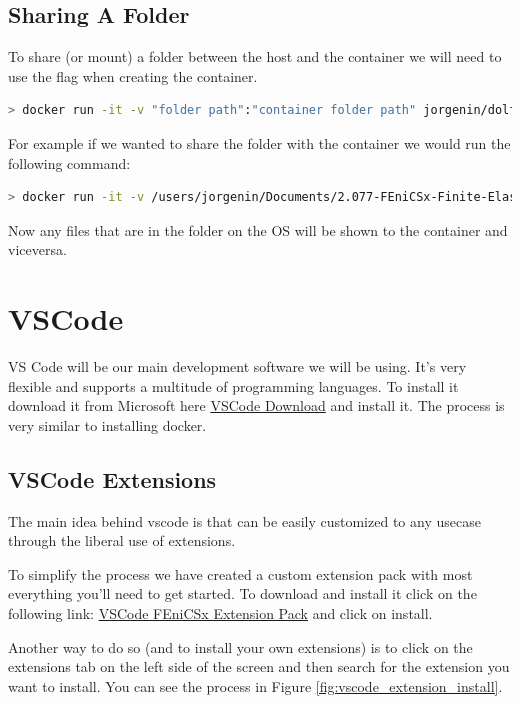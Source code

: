 \documentclass[final]{article}
\numberwithin{equation}{section}
\theoremstyle{remarkStyle}
\begin{document}
\subsection{Sharing A Folder}
To share (or mount) a folder between the host and the container we will need to use the  flag when creating the container.

\begin{lstlisting}[language=bash]
  > docker run -it -v "folder path":"container folder path" jorgenin/dolfinx-2.077:v0.8
\end{lstlisting}

For example if we wanted to share the folder  with the container we would run the following command:

\begin{lstlisting}[language=bash]
  > docker run -it -v /users/jorgenin/Documents/2.077-FEniCSx-Finite-Elasticity:/home/project jorgenin/dolfinx-2.077:v0.8
\end{lstlisting}

Now any files that are in the folder on the OS will be shown to the container and viceversa.

\section{VSCode}

VS Code will be our main development software we will be using. It's very flexible and supports a multitude of programming languages.
To install it download it from Microsoft here \href{https://code.visualstudio.com/download}{VSCode Download} and install it.
The process is very similar to installing docker.

\subsection{VSCode Extensions}

The main idea behind vscode is that can be easily customized to any usecase through the liberal use of extensions.

To simplify the process we have created a custom extension pack with most everything you'll need to get started.
To download and install it click on the following link: \href{https://marketplace.visualstudio.com/items?itemName=2077MIT.2-077-fenicsx-extension-pack}{VSCode FEniCSx Extension Pack} and click on install.

Another way to do so (and to install your own extensions) is to click on the extensions tab on the left side of the screen and then search for the extension you want to install.
You can see the process in Figure \ref{fig:vscode_extension_install}.
\end{document}

